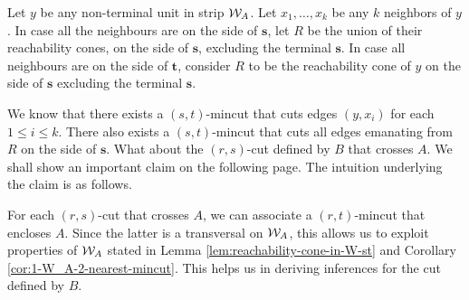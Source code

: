 Let $y$ be any non-terminal unit in strip ${\cal W}_{A}$. Let $x_1,\ldots,x_k$ be any $k$ neighbors of $y$. In case all the neighbours are on the side of $\mathbf{s}$, let $R$ be the union of their reachability cones, on the side of $\mathbf{s}$, excluding the terminal ${\mathbf{s}}$. In case all neighbours are on the side of $\mathbf{t}$, consider $R$ to be the reachability cone of $y$ on the side of $\mathbf{s}$ excluding the terminal $\mathbf{s}$.

We know that there exists a $(s,t)$-mincut that cuts edges $(y,x_i)$ for each $1\le i \le k$. There also exists a $(s,t)$-mincut that cuts all edges emanating from $R$ on the side of $\mathbf{s}$. What about the $(r,s)$-cut defined by $B$ that crosses $A$. We shall show an important claim on the following page. The intuition underlying the claim is as follows. 

For each $(r,s)$-cut that crosses $A$, we can associate a $(r,t)$-mincut that encloses $A$. Since the latter is a transversal on ${\cal W}_A$, this allows us to exploit properties of ${\cal W}_A$ stated in 
Lemma \ref{lem:reachability-cone-in-W-st} and Corollary
\ref{cor:1-W_A-2-nearest-mincut}. This helps us in deriving inferences for the cut defined by $B$.

